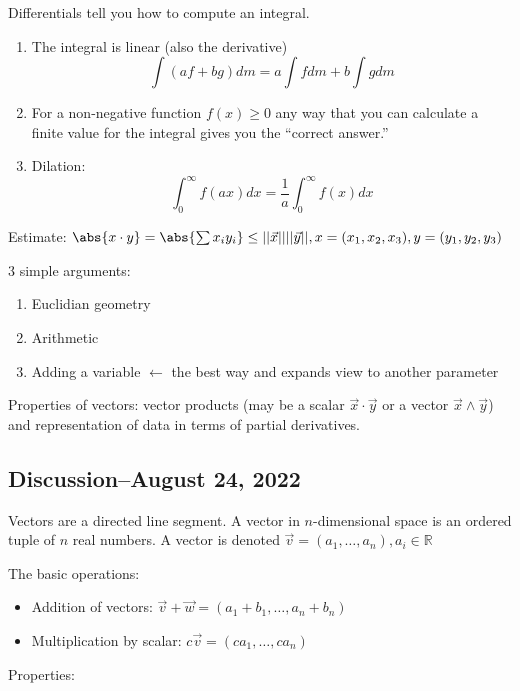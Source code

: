 \documentclass{scrreprt}
\begin{document}
Differentials tell you how to compute an integral.

\begin{enumerate}
	\item The integral is linear (also the derivative)
	      \[
		      \int(af+bg)dm=a\int fdm + b\int gdm
	      \]
	\item For a non-negative function $f(x)\geq 0$ any way that you can calculate a
	      finite value for the integral gives you the ``correct answer.''
	\item Dilation: \[
		      \int_0^\infty f(ax)dx=\frac{1}{a}\int_0^\infty f(x)dx
	      \]
\end{enumerate}

\begin{remark}

	Estimate: $\abs{x\cdot y}=\abs{\sum x_i y_i}\leq||\vec{x}||||\vec{y}||, x =(x_1,x_2,x_3), y=(y_1,y_2,y_3)$

	3 simple arguments:
	\begin{enumerate}
		\item Euclidian geometry
		\item Arithmetic
		\item Adding a variable $\leftarrow$ the best way and expands view to another parameter
	\end{enumerate}
\end{remark}
Properties of vectors:
vector products (may be a scalar $\vec{x}\cdot \vec{y}$ or a vector $\vec{x}\wedge \vec{y}$) and representation of data in terms of partial derivatives.

\subsection{Discussion--August 24, 2022}

Vectors are a directed line segment. A vector in $n$-dimensional space is an
ordered tuple of $n$ real numbers. A vector is denoted $\vec{v}=(a_1,\ldots, a_n), a_i \in \mathbb{R}$

The basic operations:

\begin{itemize}
	\item Addition of vectors: $\vec{v}+\vec{w}=(a_1+b_1,\ldots, a_n+b_n)$
	\item Multiplication by scalar: $c\vec{v}=(ca_1,\ldots, ca_n)$
\end{itemize}

Properties:
\end{document}
